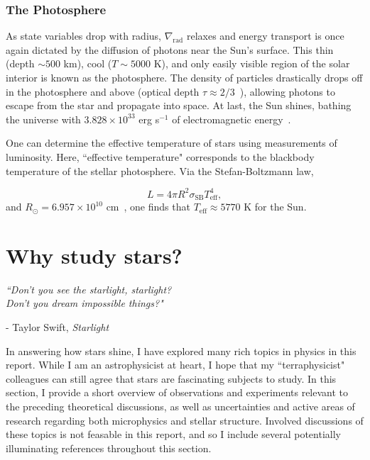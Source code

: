 \documentclass[12pt]{article}
\begin{document}
\subsubsection{The Photosphere}
As state variables drop with radius, $\nabla_\mathrm{rad}$ relaxes and energy transport is once again dictated by the diffusion of photons near the Sun's surface. This thin (depth $\sim 500$ km), cool ($T \sim 5000$ K), and only easily visible region of the solar interior is known as the photosphere. The density of particles drastically drops off in the photosphere and above (optical depth $\tau \approx 2/3$~\cite{BoB}), allowing photons to escape from the star and propagate into space. At last, the Sun shines, bathing the universe with $3.828 \times 10^{33}$ erg s$^{-1}$ of electromagnetic energy~\cite{Kopp_2016}.

One can determine the effective temperature of stars using measurements of luminosity. Here, ``effective temperature" corresponds to the blackbody temperature of the stellar photosphere. Via the Stefan-Boltzmann law,

\begin{equation}
    L = 4\pi R^2 \sigma_\mathrm{SB} T_\mathrm{eff}^4,
\end{equation}
%
and $R_\odot = 6.957 \times 10^{10}$ cm~\cite{Haberreiter_2008}, one finds that $T_\mathrm{eff} \approx 5770$ K for the Sun. 

\section{Why study stars?} \label{sec:why}
\begin{flushleft} \singlespacing \vspace{-0.25cm}
    \textit{``Don't you see the starlight, starlight?}\\
    \textit{Don't you dream impossible things?"} \\
\end{flushleft} 
\begin{flushright} \vspace{-0.5cm}
    - Taylor Swift, \textit{Starlight}
\end{flushright}
\doublespacing
%
In answering how stars shine, I have explored many rich topics in physics in this report. While I am an astrophysicist at heart, I hope that my ``terraphysicist" colleagues can still agree that stars are fascinating subjects to study. In this section, I provide a short overview of observations and experiments relevant to the preceding theoretical discussions, as well as uncertainties and active areas of research regarding both microphysics and stellar structure. Involved discussions of these topics is not feasable in this report, and so I include several potentially illuminating references throughout this section.
\end{document}
